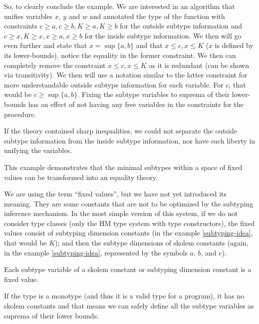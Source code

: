 \begin{ex}
So, to clearly conclude the example. We are interested in an algorithm that unifies variables $x$, $y$ and $w$ and annotated the type of the function with constraints $c \geq a, c \geq b, K \geq a, K \geq b$ for the outside subtype information and $c \geq x, K \geq x, x \geq a, x \geq b$ for the inside subtype information. We then will go even further and state that $x = \sup \{a, b\}$ and that $x \leq c, x\leq K$ ($x$ is defined by its lower-bounds), notice the equality in the former constraint. We then can completely remove the constraint $x \leq c, x \leq K$ as it is redundant (can be shown via transitivity).  We then will use a notation similar to the latter constraint for more understandable outside subtype information for each variable. For $c$, that would be $c \geq \sup \{a, b\}$. Fixing the subtype variables to suprema of their lower-bounds has an effect of not having any free variables in the constraints for the procedure.

If the theory contained sharp inequalities, we could not separate the outside subtype information from the inside subtype information, nor have such liberty in unifying the variables.

This example demonstrates that the minimal subtypes within a space of fixed values can be transformed into an equality theory.

\end{ex}

We are using the term ``fixed values'', but we have not yet introduced its meaning. They are some constants that are not to be optimized by the subtyping inference mechanism. In the most simple version of this system, if we do not consider type classes (only the HM type system with type constructors), the fixed values consist of subtyping dimension constants (in the example \ref{subtyping-idea}, that would be $K$); and then the subtype dimensions of skolem constants (again, in the example \ref{subtyping-idea}, represented by the symbols $a$, $b$, and $c$).

\begin{defn}
    Each subtype variable of a skolem constant or subtyping dimension constant is a fixed value.
\end{defn}

If the type is a monotype (and thus it is a valid type for a program), it has no skolem constants and that means we can safely define all the subtype variables as suprema of their lower bounds.

\begin{lemma}
    \label{suprema-subtyping}
\end{lemma}

